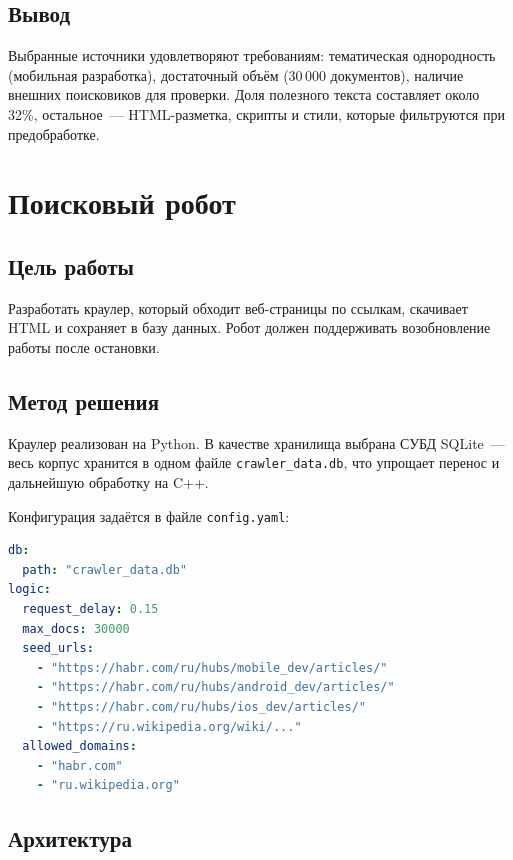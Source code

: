 \documentclass[12pt,a4paper]{article}
\begin{document}
\subsection{Вывод}

Выбранные источники удовлетворяют требованиям: тематическая однородность (мобильная разработка), достаточный объём (30\,000 документов), наличие внешних поисковиков для проверки. Доля полезного текста составляет около 32\%, остальное~--- HTML-разметка, скрипты и стили, которые фильтруются при предобработке.

\newpage


\section{Поисковый робот}

\subsection{Цель работы}

Разработать краулер, который обходит веб-страницы по ссылкам, скачивает HTML и сохраняет в базу данных. Робот должен поддерживать возобновление работы после остановки.

\subsection{Метод решения}

Краулер реализован на Python. В качестве хранилища выбрана СУБД SQLite~--- весь корпус хранится в одном файле \texttt{crawler\_data.db}, что упрощает перенос и дальнейшую обработку на C++.

Конфигурация задаётся в файле \texttt{config.yaml}:

\begin{lstlisting}[language=yaml]
db:
  path: "crawler_data.db"
logic:
  request_delay: 0.15
  max_docs: 30000
  seed_urls:
    - "https://habr.com/ru/hubs/mobile_dev/articles/"
    - "https://habr.com/ru/hubs/android_dev/articles/"
    - "https://habr.com/ru/hubs/ios_dev/articles/"
    - "https://ru.wikipedia.org/wiki/..."
  allowed_domains:
    - "habr.com"
    - "ru.wikipedia.org"
\end{lstlisting}

\subsection{Архитектура}
\end{document}
